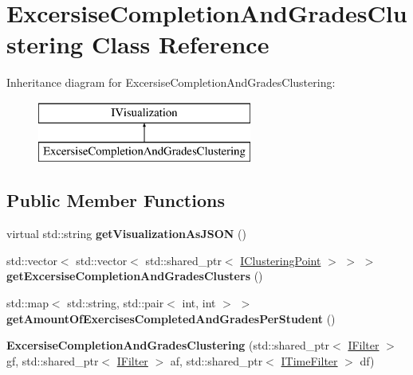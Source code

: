 \hypertarget{classExcersiseCompletionAndGradesClustering}{}\section{Excersise\+Completion\+And\+Grades\+Clustering Class Reference}
\label{classExcersiseCompletionAndGradesClustering}
Inheritance diagram for Excersise\+Completion\+And\+Grades\+Clustering\+:\begin{figure}[H]
\begin{center}
\leavevmode
\includegraphics[height=2.000000cm]{classExcersiseCompletionAndGradesClustering}
\end{center}
\end{figure}
\subsection*{Public Member Functions}
\begin{DoxyCompactItemize}
\item 
\mbox{\label{classExcersiseCompletionAndGradesClustering_ac1dd40e96f2b6ecee0c51d6e9ba5da45}} 
virtual std\+::string {\bfseries get\+Visualization\+As\+J\+S\+ON} ()
\item 
\mbox{\label{classExcersiseCompletionAndGradesClustering_a4ca7007ff3558749c5922bfa57b97ab7}} 
std\+::vector$<$ std\+::vector$<$ std\+::shared\+\_\+ptr$<$ \hyperlink{classIClusteringPoint}{I\+Clustering\+Point} $>$ $>$ $>$ {\bfseries get\+Excersise\+Completion\+And\+Grades\+Clusters} ()
\item 
\mbox{\label{classExcersiseCompletionAndGradesClustering_a8c2b6e42157a4c4e660daa4b837da126}} 
std\+::map$<$ std\+::string, std\+::pair$<$ int, int $>$ $>$ {\bfseries get\+Amount\+Of\+Exercises\+Completed\+And\+Grades\+Per\+Student} ()
\item 
\mbox{\label{classExcersiseCompletionAndGradesClustering_a8fed3c9cfe2dcffa141db566947dafa9}} 
{\bfseries Excersise\+Completion\+And\+Grades\+Clustering} (std\+::shared\+\_\+ptr$<$ \hyperlink{classIFilter}{I\+Filter} $>$ gf, std\+::shared\+\_\+ptr$<$ \hyperlink{classIFilter}{I\+Filter} $>$ af, std\+::shared\+\_\+ptr$<$ \hyperlink{classITimeFilter}{I\+Time\+Filter} $>$ df)
\end{DoxyCompactItemize}


